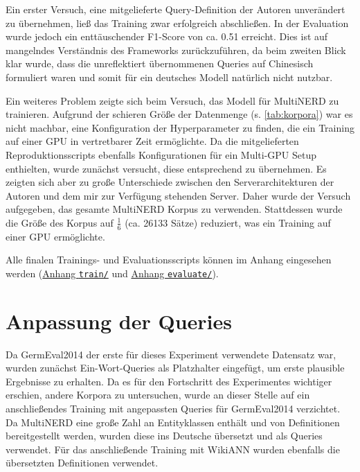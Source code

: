 Ein erster Versuch, eine mitgelieferte Query-Definition der Autoren unverändert zu übernehmen, ließ das Training zwar erfolgreich abschließen. In der Evaluation wurde jedoch ein enttäuschender F1-Score von ca. 0.51 erreicht. Dies ist auf mangelndes Verständnis des Frameworks zurückzuführen, da beim zweiten Blick klar wurde, dass die unreflektiert übernommenen Queries auf Chinesisch formuliert waren und somit für ein deutsches Modell natürlich nicht nutzbar.

Ein weiteres Problem zeigte sich beim Versuch, das Modell für MultiNERD zu trainieren. Aufgrund der schieren Größe der Datenmenge (s. \autoref{tab:korpora}) war es nicht machbar, eine Konfiguration der Hyperparameter zu finden, die ein Training auf einer GPU in vertretbarer Zeit ermöglichte. Da die mitgelieferten Reproduktionsscripts ebenfalls Konfigurationen für ein Multi-GPU Setup enthielten, wurde zunächst versucht, diese entsprechend zu übernehmen. Es zeigten sich aber zu große Unterschiede zwischen den Serverarchitekturen der Autoren und dem mir zur Verfügung stehenden Server. Daher wurde der Versuch aufgegeben, das gesamte MultiNERD Korpus zu verwenden. Stattdessen wurde die Größe des Korpus auf \(\frac{1}{6}\) (ca. 26133 Sätze) reduziert, was ein Training auf einer GPU ermöglichte.

Alle finalen Trainings- und Evaluationsscripts können im Anhang eingesehen werden (\hyperref[app:train]{Anhang \texttt{train/}} und \hyperref[app:evaluate]{Anhang \texttt{evaluate/}}).


\section{Anpassung der Queries}
\label{ch:Training:sec:Anpassung_Queries}


Da GermEval2014 der erste für dieses Experiment verwendete Datensatz war, wurden zunächst Ein-Wort-Queries als Platzhalter eingefügt, um erste plausible Ergebnisse zu erhalten. Da es für den Fortschritt des Experimentes wichtiger erschien, andere Korpora zu untersuchen, wurde an dieser Stelle auf ein anschließendes Training mit angepassten Queries für GermEval2014 verzichtet. Da MultiNERD eine große Zahl an Entityklassen enthält und von \cite{multinerd} Definitionen bereitgestellt werden, wurden diese ins Deutsche übersetzt und als Queries verwendet. Für das anschließende Training mit WikiANN wurden ebenfalls die übersetzten Definitionen verwendet.

